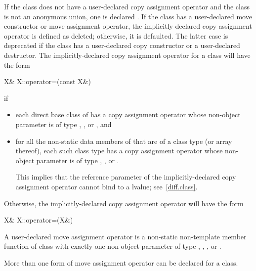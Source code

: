 \pnum
If the class does not have a user-declared copy assignment operator
and the class is not an anonymous union,
one is declared .
If the class has a user-declared move
constructor or move assignment operator, the implicitly declared copy
assignment operator is defined as deleted; otherwise, it is
defaulted.
The latter case is deprecated if the class has a user-declared copy constructor
or a user-declared destructor.
The implicitly-declared copy assignment operator for a class
will have the form
\begin{codeblock}
X& X::operator=(const X&)
\end{codeblock}
if
\begin{itemize}
\item
each direct base class  of 
has a copy assignment operator whose non-object parameter is of type
, , or , and
\item
for all the non-static data members of 
that are of a class type  (or array thereof),
each such class type has a copy assignment operator whose non-object parameter is of type
, ,
or .
\begin{footnote}
This implies that the reference parameter of the
implicitly-declared copy assignment operator cannot bind to a
 lvalue; see~\ref{diff.class}.
\end{footnote}
\end{itemize}

Otherwise, the implicitly-declared copy assignment operator
will have the form
\begin{codeblock}
X& X::operator=(X&)
\end{codeblock}

\pnum
A user-declared move assignment operator  is
a non-static non-template member function of class  with exactly
one non-object parameter of type , , , or
.
\begin{note}
More than one form of move assignment operator can be declared for a class.
\end{note}

